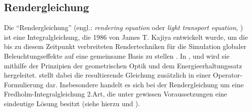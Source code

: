 
	\subsection{Rendergleichung} %
	\label{sub:rendergleichung}

		Die \enquote{Rendergleichung} (engl.: \textit{rendering equation} oder \textit{light transport equation}, \cite[S.~861]{pbrt3}) ist eine Integralgleichung, die 1986 von James T. Kajiya entwickelt wurde, um die bis zu diesem Zeitpunkt verbreiteten Rendertechniken für die Simulation globaler Beleuchtungseffekte auf eine gemeinsame Basis zu stellen \cite{kajiya-lte}.
		In \cite{kajiya-lte}, \cite[S.~349~ff,~862~ff]{pbrt3} und \cite{veach-thesis} wird sie mithilfe der Prinzipien der geometrischen Optik und dem Energieerhaltungssatz hergeleitet.
		\cite{veach-thesis} stellt dabei die resultierende Gleichung zusätzlich in einer Operator-Formulierung dar.
		Insbesondere handelt es sich bei der Rendergleichung um eine Fredholm-Integralgleichung 2.Art, die unter gewissen Voraussetzungen eine eindeutige Lösung besitzt (siehe hierzu \cite[S.~103~ff]{veach-thesis} und \cite{integral-equations}).

